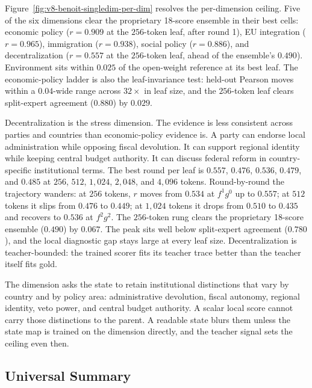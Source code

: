 Figure~\ref{fig:v8-benoit-singledim-per-dim} resolves the per-dimension
ceiling. Five of the six dimensions clear the proprietary 18-score
ensemble in their best cells: economic policy (\(r=0.909\) at the
\(256\)-token leaf, after round 1), EU integration (\(r=0.965\)),
immigration (\(r=0.938\)), social policy (\(r=0.886\)), and
decentralization (\(r=0.557\) at the \(256\)-token leaf, ahead of the
ensemble's \(0.490\)). Environment sits within \(0.025\) of the
open-weight reference at its best leaf. The economic-policy ladder is
also the leaf-invariance test: held-out Pearson moves within a
\(0.04\)-wide range across \(32\times\) in leaf size, and the
\(256\)-token leaf clears split-expert agreement (\(0.880\)) by
\(0.029\).

Decentralization is the stress dimension. The evidence is less
consistent across parties and countries than economic-policy
evidence is. A party can endorse local administration while
opposing fiscal devolution. It can support regional identity while
keeping central budget authority. It can discuss federal reform in
country-specific institutional terms. The best round per leaf is
\(0.557\), \(0.476\), \(0.536\), \(0.479\), and \(0.485\) at
\(256\), \(512\), \(1{,}024\), \(2{,}048\), and \(4{,}096\) tokens.
Round-by-round the trajectory wanders: at \(256\) tokens, \(r\)
moves from \(0.534\) at \(f^1g^0\) up to \(0.557\); at \(512\)
tokens it slips from \(0.476\) to \(0.449\); at \(1{,}024\) tokens
it drops from \(0.510\) to \(0.435\) and recovers to \(0.536\) at
\(f^2g^2\). The \(256\)-token rung clears the proprietary 18-score
ensemble (\(0.490\)) by \(0.067\). The peak sits well below
split-expert agreement (\(0.780\)), and the local diagnostic gap
stays large at every leaf size. Decentralization is teacher-bounded:
the trained scorer fits its teacher trace better than the teacher
itself fits gold.

The dimension asks the state to retain institutional distinctions
that vary by country and by policy area: administrative devolution,
fiscal autonomy, regional identity, veto power, and central budget
authority. A scalar local score cannot carry those distinctions to
the parent. A readable state blurs them unless the state map is
trained on the dimension directly, and the teacher signal sets the
ceiling even then.

\subsection{Universal Summary}\label{sec:v8-benoit-universal-summary}

